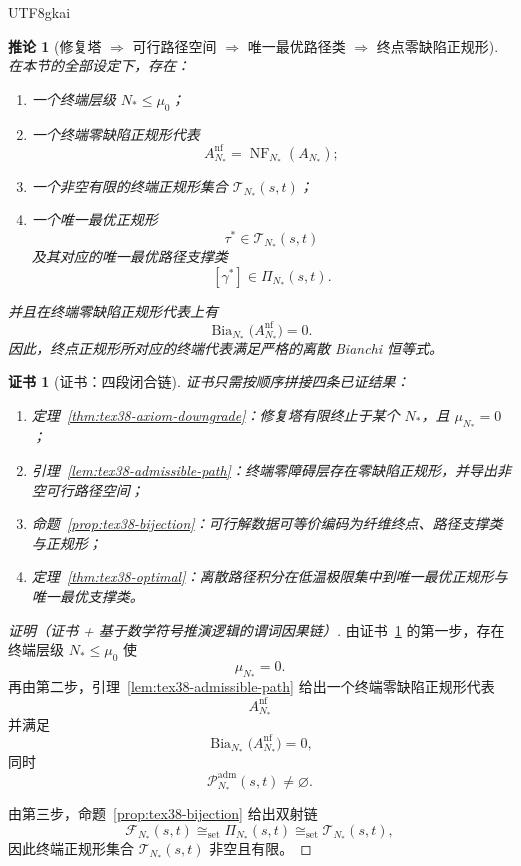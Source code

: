 \documentclass[12pt]{article}
\newtheorem{corollary}{推论}[section]
\newtheorem{Certificate}{证书}[section]
\newcommand{\NF}{\operatorname{NF}}
\newcommand{\Bia}{\operatorname{Bia}}
\begin{document}
\begin{CJK*}{UTF8}{gkai}
\begin{corollary}[修复塔 $\Rightarrow$ 可行路径空间 $\Rightarrow$ 唯一最优路径类 $\Rightarrow$ 终点零缺陷正规形]
\label{cor:tex38-terminal}
在本节的全部设定下，存在：
\begin{enumerate}
  \item 一个终端层级 $N_\ast\le\mu_0$；
  \item 一个终端零缺陷正规形代表
  \[
    A_{N_\ast}^{\mathrm{nf}}=\NF_{N_\ast}(A_{N_\ast});
  \]
  \item 一个非空有限的终端正规形集合 $\mathcal{T}_{N_\ast}(s,t)$；
  \item 一个唯一最优正规形
  \[
    \tau^\ast\in\mathcal{T}_{N_\ast}(s,t)
  \]
  及其对应的唯一最优路径支撑类
  \[
    [\gamma^\ast]\in\Pi_{N_\ast}(s,t).
  \]
\end{enumerate}
并且在终端零缺陷正规形代表上有
\[
  \Bia_{N_\ast}\bigl(A_{N_\ast}^{\mathrm{nf}}\bigr)=0.
\]
因此，终点正规形所对应的终端代表满足严格的离散 Bianchi 恒等式。
\end{corollary}

\begin{Certificate}[证书：四段闭合链]
\label{cert:tex38-terminal}
证书只需按顺序拼接四条已证结果：
\begin{enumerate}
  \item 定理~\ref{thm:tex38-axiom-downgrade}：修复塔有限终止于某个 $N_\ast$，且 $\mu_{N_\ast}=0$；
  \item 引理~\ref{lem:tex38-admissible-path}：终端零障碍层存在零缺陷正规形，并导出非空可行路径空间；
  \item 命题~\ref{prop:tex38-bijection}：可行解数据可等价编码为纤维终点、路径支撑类与正规形；
  \item 定理~\ref{thm:tex38-optimal}：离散路径积分在低温极限集中到唯一最优正规形与唯一最优支撑类。
\end{enumerate}
\end{Certificate}

\begin{proof}[证明（证书 + 基于数学符号推演逻辑的谓词因果链）]
由证书~\ref{cert:tex38-terminal} 的第一步，存在终端层级 $N_\ast\le\mu_0$ 使
\[
  \mu_{N_\ast}=0.
\]
再由第二步，引理~\ref{lem:tex38-admissible-path} 给出一个终端零缺陷正规形代表
\[
  A_{N_\ast}^{\mathrm{nf}}
\]
并满足
\[
  \Bia_{N_\ast}\bigl(A_{N_\ast}^{\mathrm{nf}}\bigr)=0,
\]
同时
\[
  \mathcal{P}^{\mathrm{adm}}_{N_\ast}(s,t)\neq\varnothing.
\]

由第三步，命题~\ref{prop:tex38-bijection} 给出双射链
\[
  \mathcal{F}_{N_\ast}(s,t)
  \cong_{\mathrm{set}}
  \Pi_{N_\ast}(s,t)
  \cong_{\mathrm{set}}
  \mathcal{T}_{N_\ast}(s,t),
\]
因此终端正规形集合 $\mathcal{T}_{N_\ast}(s,t)$ 非空且有限。


\end{proof}
\end{CJK*}
\end{document}
